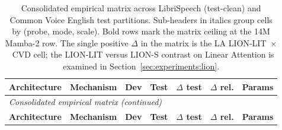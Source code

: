 {\small
\begin{longtable}{@{}p{2.6cm} p{2.4cm} r r r r r@{}}
\caption[Consolidated empirical matrix]{Consolidated empirical
matrix across LibriSpeech (test-clean) and Common Voice English
test partitions. Sub-headers in italics group cells by
(probe, mode, scale). Bold rows mark the matrix ceiling at the
14M Mamba-2 row. The single positive $\Delta$ in the matrix is
the LA LION-LIT~$\times$~CVD cell; the LION-LIT versus LION-S
contrast on Linear Attention is examined in
Section~\ref{sec:experiments:lion}.}\label{tab:results:consolidated}\\
\toprule
\textbf{Architecture} & \textbf{Mechanism} &
\textbf{Dev} & \textbf{Test} &
\textbf{$\Delta$ test} & \textbf{$\Delta$ rel.} & \textbf{Params} \\
\midrule
\endfirsthead
\multicolumn{7}{l}{\small\itshape Consolidated empirical matrix (continued)} \\
\toprule
\textbf{Architecture} & \textbf{Mechanism} &
\textbf{Dev} & \textbf{Test} &
\textbf{$\Delta$ test} & \textbf{$\Delta$ rel.} & \textbf{Params} \\
\midrule
\endhead


\end{longtable}}
